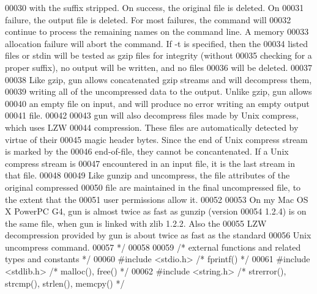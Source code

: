 \begin{DoxyCode}
00030 \textcolor{comment}{   with the suffix stripped.  On success, the original file is deleted.  On}
00031 \textcolor{comment}{   failure, the output file is deleted.  For most failures, the command will}
00032 \textcolor{comment}{   continue to process the remaining names on the command line.  A memory}
00033 \textcolor{comment}{   allocation failure will abort the command.  If -t is specified, then the}
00034 \textcolor{comment}{   listed files or stdin will be tested as gzip files for integrity (without}
00035 \textcolor{comment}{   checking for a proper suffix), no output will be written, and no files}
00036 \textcolor{comment}{   will be deleted.}
00037 \textcolor{comment}{}
00038 \textcolor{comment}{   Like gzip, gun allows concatenated gzip streams and will decompress them,}
00039 \textcolor{comment}{   writing all of the uncompressed data to the output.  Unlike gzip, gun allows}
00040 \textcolor{comment}{   an empty file on input, and will produce no error writing an empty output}
00041 \textcolor{comment}{   file.}
00042 \textcolor{comment}{}
00043 \textcolor{comment}{   gun will also decompress files made by Unix compress, which uses LZW}
00044 \textcolor{comment}{   compression.  These files are automatically detected by virtue of their}
00045 \textcolor{comment}{   magic header bytes.  Since the end of Unix compress stream is marked by the}
00046 \textcolor{comment}{   end-of-file, they cannot be concantenated.  If a Unix compress stream is}
00047 \textcolor{comment}{   encountered in an input file, it is the last stream in that file.}
00048 \textcolor{comment}{}
00049 \textcolor{comment}{   Like gunzip and uncompress, the file attributes of the original compressed}
00050 \textcolor{comment}{   file are maintained in the final uncompressed file, to the extent that the}
00051 \textcolor{comment}{   user permissions allow it.}
00052 \textcolor{comment}{}
00053 \textcolor{comment}{   On my Mac OS X PowerPC G4, gun is almost twice as fast as gunzip (version}
00054 \textcolor{comment}{   1.2.4) is on the same file, when gun is linked with zlib 1.2.2.  Also the}
00055 \textcolor{comment}{   LZW decompression provided by gun is about twice as fast as the standard}
00056 \textcolor{comment}{   Unix uncompress command.}
00057 \textcolor{comment}{ */}
00058 
00059 \textcolor{comment}{/* external functions and related types and constants */}
00060 \textcolor{preprocessor}{#include <stdio.h>}          \textcolor{comment}{/* fprintf() */}
00061 \textcolor{preprocessor}{#include <stdlib.h>}         \textcolor{comment}{/* malloc(), free() */}
00062 \textcolor{preprocessor}{#include <string.h>}         \textcolor{comment}{/* strerror(), strcmp(), strlen(), memcpy() */}

\end{DoxyCode}
